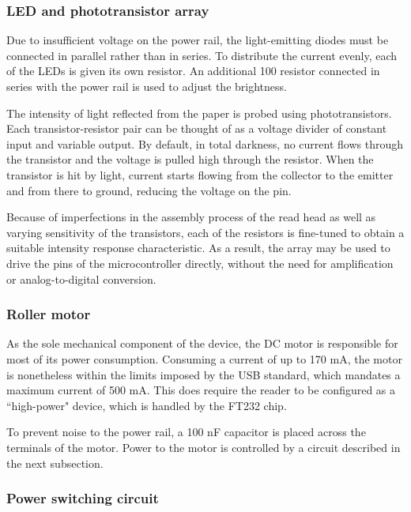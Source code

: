 \documentclass{article}
\begin{document}
	\subsubsection{LED and phototransistor array}
	
	Due to insufficient voltage on the power rail, the light-emitting diodes
	must be connected in parallel rather than in series. To distribute the
	current evenly, each of the LEDs is given its own resistor. An additional
	100 \textOmega {} resistor connected in series with the power rail is used
	to adjust the brightness.
	
	The intensity of light reflected from the paper is probed using
	phototransistors. Each transistor-resistor pair can be thought of as a
	voltage divider of constant input and variable output. By default, in total
	darkness, no current flows through the transistor and the voltage is pulled
	high through the resistor. When the transistor is hit by light, current
	starts flowing from the collector to the emitter and from there to ground,
	reducing the voltage on the pin.
	
	Because of imperfections in the assembly process of the read head as well
	as varying sensitivity of the transistors, each of the resistors is
	fine-tuned to obtain a suitable intensity response characteristic. As a
	result, the array may be used to drive the pins of the microcontroller
	directly, without the need for amplification or analog-to-digital
	conversion.
	
	\subsubsection{Roller motor}
	
	As the sole mechanical component of the device, the DC motor is responsible
	for most of its power consumption. Consuming a current of up to 170 mA, the
	motor is nonetheless within the limits imposed by the USB standard, which
	mandates a maximum current of 500 mA. This does require the reader to be
	configured as a ``high-power" device, which is handled by the FT232 chip.
	
	To prevent noise to the power rail, a 100 nF capacitor is placed across the
	terminals of the motor. Power to the motor is controlled by a circuit
	described in the next subsection.
	
	\subsubsection{Power switching circuit}
	
\end{document}
